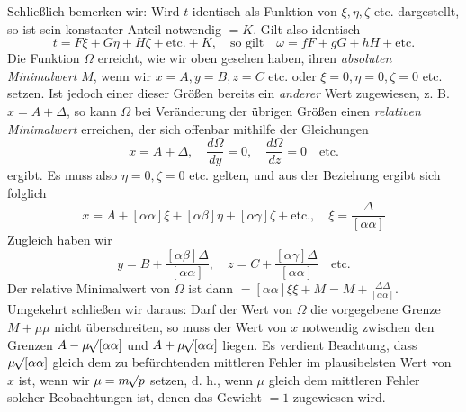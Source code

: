 Schließlich bemerken wir: Wird \(t\) identisch als Funktion von \(\xi,\eta,\zeta\) etc. dargestellt, so ist sein konstanter Anteil notwendig \(=K\). Gilt also identisch
\[
t=F\xi+G\eta+H\zeta+\text{etc.}+K,\quad\text{so gilt}\quad\omega=fF+gG+hH+\text{etc.}
\]
Die Funktion \(\Omega\) erreicht, wie wir oben gesehen haben, ihren \textit{absoluten Minimalwert} \(M\), wenn wir \(x=A,\allowbreak y=B,\allowbreak z=C\) etc. oder \(\xi=0,\allowbreak\eta=0,\allowbreak\zeta=0\) etc. setzen. Ist jedoch einer dieser Größen bereits ein \textit{anderer} Wert zugewiesen, z. B. \(x=A+\Delta\), so kann \(\Omega\) bei Veränderung der übrigen Größen einen \textit{relativen Minimalwert} erreichen, der sich offenbar mithilfe der Gleichungen
\[
x=A+\Delta,\quad\frac{d\Omega}{dy}=0,\quad\frac{d\Omega}{dz}=0\quad\text{etc.}
\]
ergibt. Es muss also \(\eta=0,\zeta=0\) etc. gelten, und aus der Beziehung ergibt sich folglich
\[
x=A+[\alpha\alpha]\xi+[\alpha\beta]\eta+[\alpha\gamma]\zeta+\text{etc.},\quad\xi=\frac{\Delta}{[\alpha\alpha]}
\]
Zugleich haben wir
\[
y=B+\frac{[\alpha\beta]\Delta}{[\alpha\alpha]},\quad z=C+\frac{[\alpha\gamma]\Delta}{[\alpha\alpha]}\quad\text{etc.}
\]
Der relative Minimalwert von \(\Omega\) ist dann \(=[\alpha\alpha]\xi\xi+M=M+\frac{\Delta\Delta}{[\alpha\alpha]}\). Umgekehrt schließen wir daraus: Darf der Wert von \(\Omega\) die vorgegebene Grenze \(M+\mu\mu\) nicht überschreiten, so muss der Wert von \(x\) notwendig zwischen den Grenzen \(A-\mu\mathord{{}^{}\!\surd}[\alpha\alpha]\) und \(A+\mu\mathord{{}^{}\!\surd}[\alpha\alpha]\) liegen. Es verdient Beachtung, dass \(\mu\mathord{{}^{}\!\surd}[\alpha\alpha]\) gleich dem zu befürchtenden mittleren Fehler im plausibelsten Wert von \(x\) ist, wenn wir \(\mu=m\mathord{{}^{}\!\surd}p\) setzen, d. h., wenn \(\mu\) gleich dem mittleren Fehler solcher Beobachtungen ist, denen das Gewicht \(=1\) zugewiesen wird.

